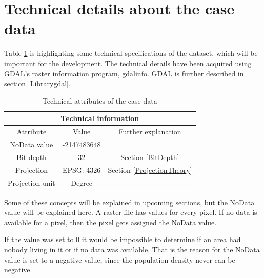 \section{Technical details about the case data}\label{caseDataTech}

Table \ref{tabTech} is highlighting some technical specifications of the dataset, which will be important for the development. The technical details have been acquired using GDAL's raster information program, gdalinfo. GDAL is further described in section \ref{Librarygdal}.

\begin{table}[h]%
	\centering
\begin{tabular}{|c|c|c|}
	\hline 
	\multicolumn{3}{|c|}{Technical information} \\ 
	\hline 
	Attribute & Value & Further explanation \\ 
	\hline 
	NoData value & -2147483648 &  \\ 
	\hline 
	Bit depth & 32 &  Section \ref{BitDepth}\\ 
	\hline 
	Projection & EPSG: 4326 &  Section \ref{ProjectionTheory}\\ 
	\hline 
	Projection unit & Degree &   \\ 
	\hline 
\end{tabular}
\caption{Technical attributes of the case data}
 \label{tabTech}
\end{table}

Some of these concepts will be explained in upcoming sections, but the NoData value will be explained here. A raster file has values for every pixel. If no data is available for a pixel, then the pixel gets assigned the NoData value. \citep{ArcMapOnNoData}

If the value was set to 0 it would be impossible to determine if an area had nobody living in it or if no data was available. That is the reason for the NoData value is set to a negative value, since the population density never can be negative.

